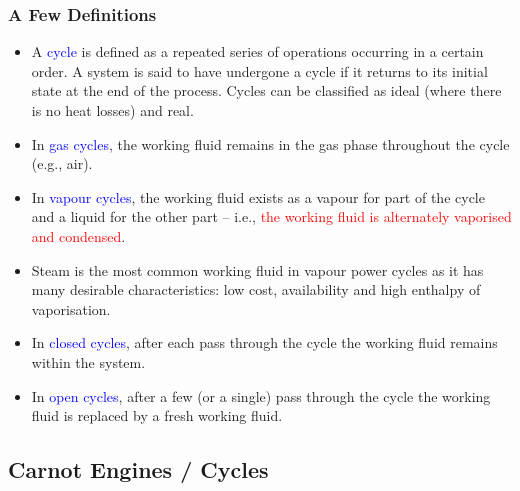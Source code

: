 \documentclass[10pt,compress]{beamer}
\newcommand{\red}{\textcolor{red}}
\begin{document}
\begin{frame}
 \frametitle{A Few Definitions}
 \begin{itemize}
  \item <1-> A \textcolor{blue}{cycle} is defined as a repeated series of operations occurring in a certain order. A system is said to have undergone a cycle if it returns to its initial state at the end of the process.  Cycles can be classified as ideal (where there is no heat losses) and real. 
  \item <2-> In \textcolor{blue}{gas cycles}, the working fluid remains in the gas phase throughout the cycle (e.g., air).
  \item <3-> In \textcolor{blue}{vapour cycles}, the working fluid exists as a vapour for part of the cycle and a liquid for the other part -- i.e., \red{the working fluid is alternately vaporised and condensed}.
  \item <4-> Steam is the most common working fluid in vapour power cycles as it has many desirable characteristics: low cost, availability and high enthalpy of vaporisation.
  \item <5-> In \textcolor{blue}{closed cycles}, after each pass through the cycle the working fluid remains within the system.
  \item <6-> In \textcolor{blue}{open cycles}, after a few (or a single) pass through the cycle the working fluid is replaced by a fresh working fluid.
 \end{itemize}
\end{frame}


\subsection{Carnot Engines / Cycles}
\end{document}
